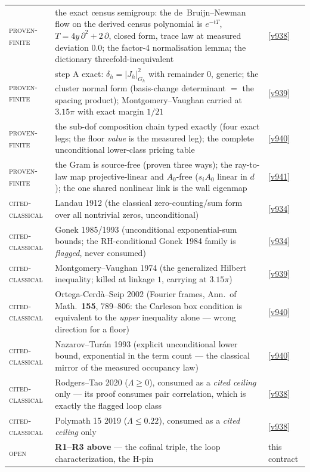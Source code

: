 \documentclass[11pt,a4paper]{article}
\begin{document}
\begin{center}
\begin{tabularx}{\linewidth}{@{}l>{\hsize=1.45\hsize\raggedright\arraybackslash}X>{\hsize=0.55\hsize\raggedright\arraybackslash}X@{}}
\textsc{proven-finite} & the exact census semigroup: the de~Bruijn--Newman flow on the derived census polynomial is $e^{-tT}$, $T = 4y\,\partial^2 + 2\,\partial$, closed form, trace law at measured deviation $0.0$; the factor-4 normalisation lemma; the dictionary threefold-inequivalent & \vref{v938} \\
\textsc{proven-finite} & step A exact: $\delta_h = |J_h|^2_{G_h}$ with remainder $0$, generic; the cluster normal form (basis-change determinant $=$ the spacing product); Montgomery--Vaughan carried at $3.15\pi$ with exact margin $1/21$ & \vref{v939} \\
\textsc{proven-finite} & the sub-dof composition chain typed exactly (four exact legs; the floor \emph{value} is the measured leg); the complete unconditional lower-class pricing table & \vref{v940} \\
\textsc{proven-finite} & the Gram is source-free (proven three ways); the ray-to-law map projective-linear and $A_0$-free ($s_i A_0$ linear in $d$); the one shared nonlinear link is the wall eigenmap & \vref{v941} \\
\textsc{cited-classical} & Landau 1912 (the classical zero-counting/sum form over all nontrivial zeros, unconditional) & \vref{v934} \\
\textsc{cited-classical} & Gonek 1985/1993 (unconditional exponential-sum bounds; the RH-conditional Gonek 1984 family is \emph{flagged}, never consumed) & \vref{v934} \\
\textsc{cited-classical} & Montgomery--Vaughan 1974 (the generalized Hilbert inequality; killed at linkage $1$, carrying at $3.15\pi$) & \vref{v939} \\
\textsc{cited-classical} & Ortega-Cerd\`a--Seip 2002 (Fourier frames, Ann.\ of Math.\ \textbf{155}, 789--806: the Carleson box condition is equivalent to the \emph{upper} inequality alone --- wrong direction for a floor) & \vref{v940} \\
\textsc{cited-classical} & Nazarov--Tur\'an 1993 (explicit unconditional lower bound, exponential in the term count --- the classical mirror of the measured occupancy law) & \vref{v940} \\
\textsc{cited-classical} & Rodgers--Tao 2020 ($\Lambda \ge 0$), consumed as a \emph{cited ceiling} only --- its proof consumes pair correlation, which is exactly the flagged loop class & \vref{v938} \\
\textsc{cited-classical} & Polymath 15 2019 ($\Lambda \le 0.22$), consumed as a \emph{cited ceiling} only & \vref{v938} \\
\textsc{open} & \textbf{R1--R3 above} --- the cofinal triple, the loop characterization, the H-pin & this contract \\
\bottomrule
\end{tabularx}
\end{center}
\end{document}
